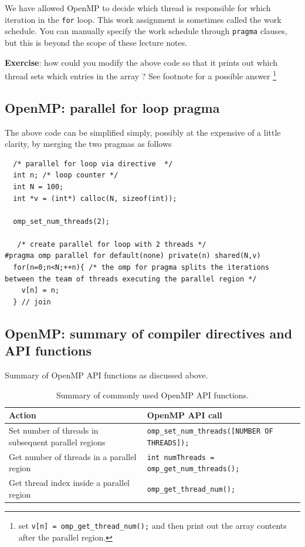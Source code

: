 We have allowed OpenMP to decide which thread is responsible for which iteration in the \texttt{for} loop. This work assignment is sometimes called the work schedule. You can manually specify the work schedule through \texttt{pragma} clauses, but this is beyond the scope of these lecture notes.

{\bf Exercise}: how could you modify the above code so that it prints out which thread sets which entries in the array ?  See footnote for a possible answer \footnote{set \texttt{v[n] = omp\_get\_thread\_num();} and then print out the array contents after the parallel region.}

\subsection{OpenMP:  parallel for loop pragma}

The above code can be simplified simply, possibly at the expensive of a little clarity, by merging the two pragmas as follows

\begin{verbatim}
  /* parallel for loop via directive  */
  int n; /* loop counter */
  int N = 100;
  int *v = (int*) calloc(N, sizeof(int));

  omp_set_num_threads(2);

   /* create parallel for loop with 2 threads */
#pragma omp parallel for default(none) private(n) shared(N,v)
  for(n=0;n<N;++n){ /* the omp for pragma splits the iterations between the team of threads executing the parallel region */
    v[n] = n;
  } // join   
\end{verbatim}




\subsection{OpenMP: summary of compiler directives and API functions}

Summary of OpenMP  API functions as discussed above.
\begin{table}[htbp!]
    \centering
    \begin{tabular}{l|l} \hline
      Action & OpenMP API call\\ \hline
      Set number of threads in subsequent parallel regions & \texttt{omp\_set\_num\_threads([NUMBER OF THREADS]);} \\
      Get number of threads in a parallel region & \texttt{int numThreads = omp\_get\_num\_threads();} \\
      Get thread index inside a parallel region & \texttt{omp\_get\_thread\_num();} \\
    \hline\end{tabular}
    \caption{Summary of commonly used OpenMP API functions.}
    \label{ompDirectives.tab}
\end{table}

